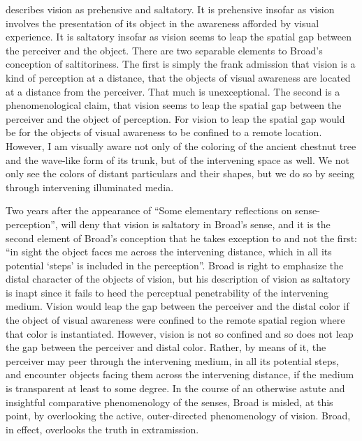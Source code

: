 \citet{Broad:1952kx} describes vision as prehensive and saltatory. It is prehensive insofar as vision involves the presentation of its object in the awareness afforded by visual experience. It is saltatory insofar as vision seems to leap the spatial gap between the perceiver and the object. There are two separable elements to Broad's conception of saltitoriness. The first is simply the frank admission that vision is a kind of perception at a distance, that the objects of visual awareness are located at a distance from the perceiver. That much is unexceptional. The second is a phenomenological claim, that vision seems to leap the spatial gap between the perceiver and the object of perception. For vision to leap the spatial gap would be for the objects of visual awareness to be confined to a remote location. However, I am visually aware not only of the coloring of the ancient chestnut tree and the wave-like form of its trunk, but of the intervening space as well. We not only see the colors of distant particulars and their shapes, but we do so by seeing through intervening illuminated media. 

Two years after the appearance of ``Some elementary reflections on sense-per\-cep\-tion'', \citet[518]{Jonas:1954aa} will deny that vision is saltatory in Broad’s sense, and it is the second element of Broad's conception that he takes exception to and not the first: ``in sight the object faces me across the intervening distance, which in all its potential `steps' is included in the perception''. Broad is right to emphasize the distal character of the objects of vision, but his description of vision as saltatory is inapt since it fails to heed the perceptual penetrability of the intervening medium. Vision would leap the gap between the perceiver and the distal color if the object of visual awareness were confined to the remote spatial region where that color is instantiated. However, vision is not so confined and so does not leap the gap between the perceiver and distal color. Rather, by means of it, the perceiver may peer through the intervening medium, in all its potential steps, and encounter objects facing them across the intervening distance, if the medium is transparent at least to some degree. In the course of an otherwise astute and insightful comparative phenomenology of the senses, Broad is misled, at this point, by overlooking the active, outer-directed phenomenology of vision. Broad, in effect, overlooks the truth in extramission.

